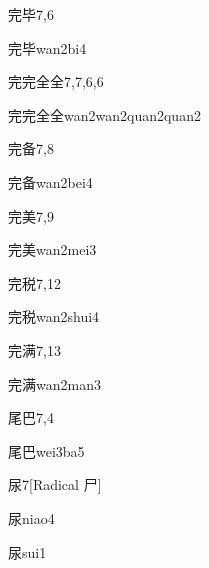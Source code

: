\begin{entry}{完毕}{7,6}
  \begin{phonetics}{完毕}{wan2bi4}
  \end{phonetics}
\end{entry}

\begin{entry}{完完全全}{7,7,6,6}
  \begin{phonetics}{完完全全}{wan2wan2quan2quan2}
  \end{phonetics}
\end{entry}

\begin{entry}{完备}{7,8}
  \begin{phonetics}{完备}{wan2bei4}
  \end{phonetics}
\end{entry}

\begin{entry}{完美}{7,9}
  \begin{phonetics}{完美}{wan2mei3}
  \end{phonetics}
\end{entry}

\begin{entry}{完税}{7,12}
  \begin{phonetics}{完税}{wan2shui4}
  \end{phonetics}
\end{entry}

\begin{entry}{完满}{7,13}
  \begin{phonetics}{完满}{wan2man3}
  \end{phonetics}
\end{entry}

\begin{entry}{尾巴}{7,4}
  \begin{phonetics}{尾巴}{wei3ba5}
  \end{phonetics}
\end{entry}

\begin{entry}{尿}{7}[Radical 尸]
  \begin{phonetics}{尿}{niao4}
  \end{phonetics}
  \begin{phonetics}{尿}{sui1}
  \end{phonetics}
\end{entry}

